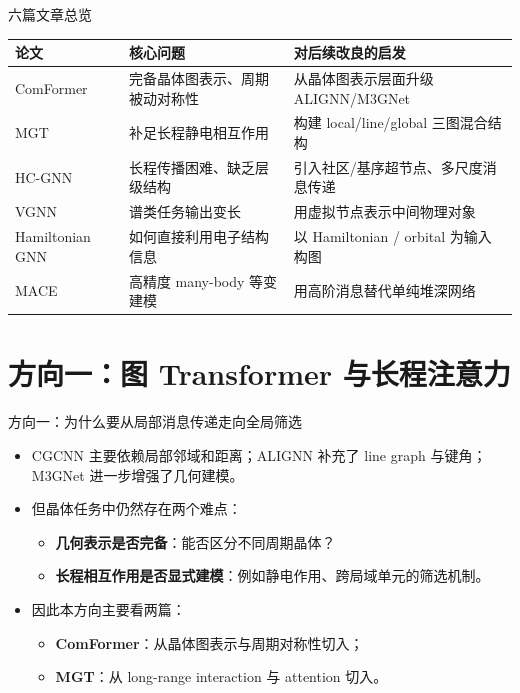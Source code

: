 \documentclass{beamer}
\begin{document}
\begin{frame}{六篇文章总览}
\small
\centering
\begin{tabular}{p{2.2cm} p{3.5cm} p{4.2cm}}
\toprule
论文 & 核心问题 & 对后续改良的启发 \\
\midrule
ComFormer & 完备晶体图表示、周期被动对称性 & 从晶体图表示层面升级 ALIGNN/M3GNet \\
MGT & 补足长程静电相互作用 & 构建 local/line/global 三图混合结构 \\
HC-GNN & 长程传播困难、缺乏层级结构 & 引入社区/基序超节点、多尺度消息传递 \\
VGNN & 谱类任务输出变长 & 用虚拟节点表示中间物理对象 \\
Hamiltonian GNN & 如何直接利用电子结构信息 & 以 Hamiltonian / orbital 为输入构图 \\
MACE & 高精度 many-body 等变建模 & 用高阶消息替代单纯堆深网络 \\
\bottomrule
\end{tabular}
\end{frame}

\section{方向一：图 Transformer 与长程注意力}

\begin{frame}{方向一：为什么要从局部消息传递走向全局筛选}
\begin{itemize}
  \item CGCNN 主要依赖局部邻域和距离；ALIGNN 补充了 line graph 与键角；M3GNet 进一步增强了几何建模。
  \item 但晶体任务中仍然存在两个难点：
  \begin{itemize}
    \item \textbf{几何表示是否完备}：能否区分不同周期晶体？
    \item \textbf{长程相互作用是否显式建模}：例如静电作用、跨局域单元的筛选机制。
  \end{itemize}
  \item 因此本方向主要看两篇：
  \begin{itemize}
    \item \textbf{ComFormer}：从晶体图表示与周期对称性切入；
    \item \textbf{MGT}：从 long-range interaction 与 attention 切入。
  \end{itemize}
\end{itemize}
\end{frame}
\end{document}
